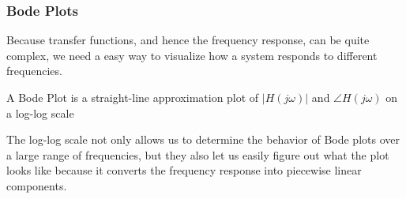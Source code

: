 \subsubsection{Bode Plots}
Because transfer functions, and hence the frequency response, can be quite complex, we need a easy way to visualize how a system responds to different frequencies.
\begin{definition}
    A Bode Plot is a straight-line approximation plot of $|H(j\omega)|$ and $\angle H(j\omega)$ on a log-log scale
\end{definition}
The log-log scale not only allows us to determine the behavior of Bode plots over a large range of frequencies,
but they also let us easily figure out what the plot looks like because it converts the frequency response into piecewise linear components.

